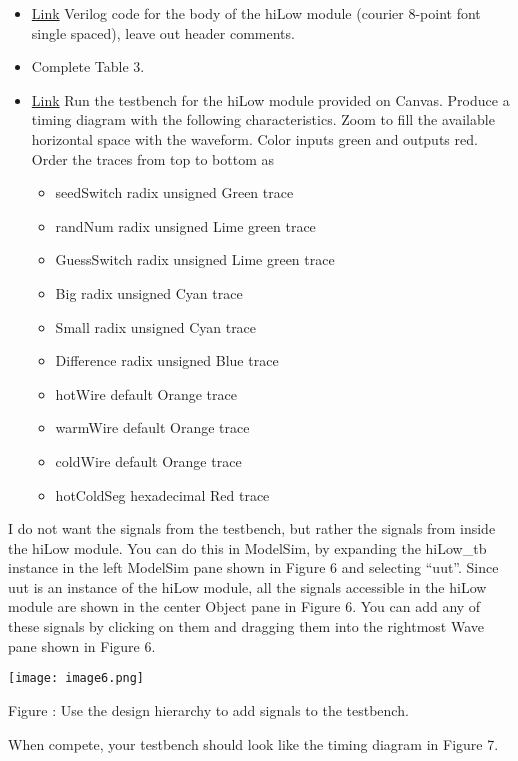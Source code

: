 \begin{itemize}
\item
  \protect\hyperlink{hilow-module}{Link} Verilog code for the body of
  the hiLow module (courier 8-point font single spaced), leave out
  header comments.
\item
  Complete Table 3.
\item
  \protect\hyperlink{hilow_tb-module}{Link} Run the testbench for the
  hiLow module provided on Canvas. Produce a timing diagram with the
  following characteristics. Zoom to fill the available horizontal space
  with the waveform. Color inputs green and outputs red. Order the
  traces from top to bottom as

  \begin{itemize}
  \item
    seedSwitch radix unsigned Green trace
  \item
    randNum radix unsigned Lime green trace
  \item
    GuessSwitch radix unsigned Lime green trace
  \item
    Big radix unsigned Cyan trace
  \item
    Small radix unsigned Cyan trace
  \item
    Difference radix unsigned Blue trace
  \item
    hotWire default Orange trace
  \item
    warmWire default Orange trace
  \item
    coldWire default Orange trace
  \item
    hotColdSeg hexadecimal Red trace
  \end{itemize}
\end{itemize}

I do not want the signals from the testbench, but rather the signals
from inside the hiLow module. You can do this in ModelSim, by expanding
the hiLow\_tb instance in the left ModelSim pane shown in Figure 6 and
selecting ``uut''. Since uut is an instance of the hiLow module, all the
signals accessible in the hiLow module are shown in the center Object
pane in Figure 6. You can add any of these signals by clicking on them
and dragging them into the rightmost Wave pane shown in Figure 6.

\texttt{[image:  image6.png]}

Figure : Use the design hierarchy to add signals to the testbench.

When compete, your testbench should look like the timing diagram in
Figure 7.

